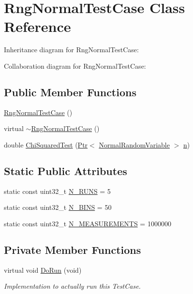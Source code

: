 \hypertarget{classRngNormalTestCase}{}\section{Rng\+Normal\+Test\+Case Class Reference}
\label{classRngNormalTestCase}


Inheritance diagram for Rng\+Normal\+Test\+Case\+:


Collaboration diagram for Rng\+Normal\+Test\+Case\+:
\subsection*{Public Member Functions}
\begin{DoxyCompactItemize}
\item 
\hyperlink{classRngNormalTestCase_ab7a9a0a651496ba15762435f7e6c3f79}{Rng\+Normal\+Test\+Case} ()
\item 
virtual \hyperlink{classRngNormalTestCase_a411c5280ae00a4a67cf04c226db4b649}{$\sim$\+Rng\+Normal\+Test\+Case} ()
\item 
double \hyperlink{classRngNormalTestCase_a342c783782fc1ff54521ed57776498ab}{Chi\+Squared\+Test} (\hyperlink{classns3_1_1Ptr}{Ptr}$<$ \hyperlink{classns3_1_1NormalRandomVariable}{Normal\+Random\+Variable} $>$ \hyperlink{lte__link__budget__x2__handover__measures_8m_abdb05bc5a064cf642a06c83b3392f148}{n})
\end{DoxyCompactItemize}
\subsection*{Static Public Attributes}
\begin{DoxyCompactItemize}
\item 
static const uint32\+\_\+t \hyperlink{classRngNormalTestCase_a5f0643e09cb098d4691f53cc7305ddf9}{N\+\_\+\+R\+U\+NS} = 5
\item 
static const uint32\+\_\+t \hyperlink{classRngNormalTestCase_af6723698b0b1be88541e9f54a2ba6114}{N\+\_\+\+B\+I\+NS} = 50
\item 
static const uint32\+\_\+t \hyperlink{classRngNormalTestCase_a3e7f658aca3704a9b93cfe8cd7d7d888}{N\+\_\+\+M\+E\+A\+S\+U\+R\+E\+M\+E\+N\+TS} = 1000000
\end{DoxyCompactItemize}
\subsection*{Private Member Functions}
\begin{DoxyCompactItemize}
\item 
virtual void \hyperlink{classRngNormalTestCase_a6eaa7e1dc1a88104c3a6fcd5b2d14841}{Do\+Run} (void)
\begin{DoxyCompactList}\small\item\em Implementation to actually run this Test\+Case. \end{DoxyCompactList}\end{DoxyCompactItemize}
